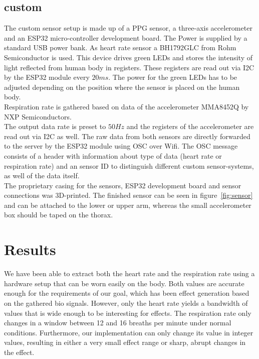 \documentclass{sigchi-ext}
\begin{document}
\subsection{custom}
The custom sensor setup is made up of a PPG sensor, a three-axis accelerometer and an ESP32 micro-controller development board. The Power is supplied by a standard USB power bank. As heart rate sensor a BH1792GLC from Rohm Semiconductor is used.
This device drives green LEDs and stores the intensity of light reflected from human body in registers\cite{heartratesensor}.
These registers are read out via I2C by the ESP32 module every $20ms$. The power for the green LEDs has to
be adjusted depending on the position where the sensor is placed on the human body. \\
Respiration rate is gathered based on data of the accelerometer MMA8452Q by NXP Semiconductors.\\
The output data rate is preset to $50Hz$ and the registers of the accelerometer are read out via I2C as well.
The raw data from both sensors are directly forwarded to the server by the ESP32 module using OSC over Wifi. The OSC message consists of a
header with information about type of data (heart rate or respiration rate) and an sensor ID to distinguish
different custom sensor-systems, as well of the data itself. \\
The proprietary casing for the sensors, ESP32 development board and sensor connections was 3D-printed. The finished sensor can be seen in figure~\ref{fig:sensor} and can be attached to the lower or upper arm, whereas the small accelerometer box should be taped
on the thorax. 
\section{Results}

We have been able to extract both the heart rate and the respiration rate using a hardware setup that can be
worn easily on the body. Both values are accurate enough for the requirements of our goal, which has been
effect generation based on the gathered bio signals. However, only the heart rate yields a bandwidth of values
that is wide enough to be interesting for effects. The respiration rate only changes in a window between 12 and 16 breaths per minute under normal conditions. Furthermore, our implementation can only change its value in integer values, resulting in either a very small effect range or sharp, abrupt changes in the effect. %
\end{document}
